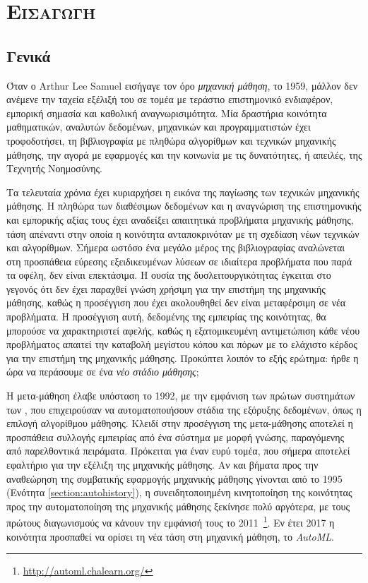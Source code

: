 \chapter{\scshape{Εισαγωγή}}
\section{Γενικά}
Όταν ο Arthur Lee Samuel εισήγαγε τον όρο \textit{μηχανική μάθηση}, το 1959, μάλλον δεν ανέμενε την ταχεία εξέλιξή του σε τομέα με τεράστιο επιστημονικό ενδιαφέρον, εμπορική σημασία και καθολική αναγνωρισιμότητα. Μία δραστήρια κοινότητα μαθηματικών, αναλυτών δεδομένων, μηχανικών και προγραμματιστών έχει τροφοδοτήσει, τη βιβλιογραφία με πληθώρα αλγορίθμων και τεχνικών μηχανικής μάθησης, την αγορά με εφαρμογές και την κοινωνία με τις δυνατότητες, ή απειλές, της Τεχνητής Νοημοσύνης.

Τα τελευταία χρόνια έχει κυριαρχήσει η εικόνα της παγίωσης των τεχνικών μηχανικής μάθησης. Η πληθώρα των διαθέσιμων δεδομένων και η αναγνώριση της επιστημονικής και εμπορικής αξίας τους έχει αναδείξει απαιτητικά προβλήματα μηχανικής μάθησης, τάση απέναντι στην οποία η κοινότητα ανταποκρινόταν με τη σχεδίαση νέων τεχνικών και αλγορίθμων. Σήμερα ωστόσο ένα μεγάλο μέρος της βιβλιογραφίας αναλώνεται στη προσπάθεια εύρεσης εξειδικευμένων λύσεων σε ιδιαίτερα προβλήματα που παρά τα οφέλη, δεν είναι επεκτάσιμα. Η ουσία της δυσλειτουργικότητας έγκειται στο γεγονός ότι δεν έχει παραχθεί γνώση χρήσιμη για την επιστήμη της μηχανικής μάθησης, καθώς η προσέγγιση που έχει ακολουθηθεί δεν είναι μεταφέρσιμη σε νέα προβλήματα. Η προσέγγιση αυτή, δεδομένης της εμπειρίας της κοινότητας, θα μπορούσε να χαρακτηριστεί αφελής, καθώς η εξατομικευμένη αντιμετώπιση κάθε νέου προβλήματος απαιτεί την καταβολή μεγίστου κόπου και πόρων με το ελάχιστο κέρδος για την επιστήμη της μηχανικής μάθησης. Προκύπτει λοιπόν το εξής ερώτημα: ήρθε η ώρα να περάσουμε σε ένα \textit{νέο στάδιο μάθησης};

Η μετα-μάθηση έλαβε υπόσταση το 1992, με την εμφάνιση των πρώτων συστημάτων των \citet{craw1993,Brazdil1994}, που επιχειρούσαν να αυτοματοποιήσουν στάδια της εξόρυξης δεδομένων, όπως η επιλογή αλγορίθμου μάθησης. Κλειδί στην προσέγγιση της μετα-μάθησης αποτελεί η προσπάθεια συλλογής εμπειρίας από ένα σύστημα με μορφή γνώσης, παραγόμενης από παρελθοντικά πειράματα. Πρόκειται για έναν ευρύ τομέα, που σήμερα αποτελεί εφαλτήριο για την εξέλιξη της μηχανικής μάθησης. Αν και βήματα προς την αναθεώρηση της συμβατικής εφαρμογής μηχανικής μάθησης γίνονται από το 1995 (Ενότητα \ref{section:autohistory}), η συνειδητοποιημένη κινητοποίηση της κοινότητας προς την αυτοματοποίηση της μηχανικής μάθησης ξεκίνησε πολύ αργότερα, με τους πρώτους διαγωνισμούς να κάνουν την εμφάνισή τους το 2011~\footnote{\url{http://automl.chalearn.org/}}. Εν έτει 2017 η κοινότητα προσπαθεί να ορίσει τη νέα τάση στη μηχανική μάθηση, το \textit{AutoML}.

